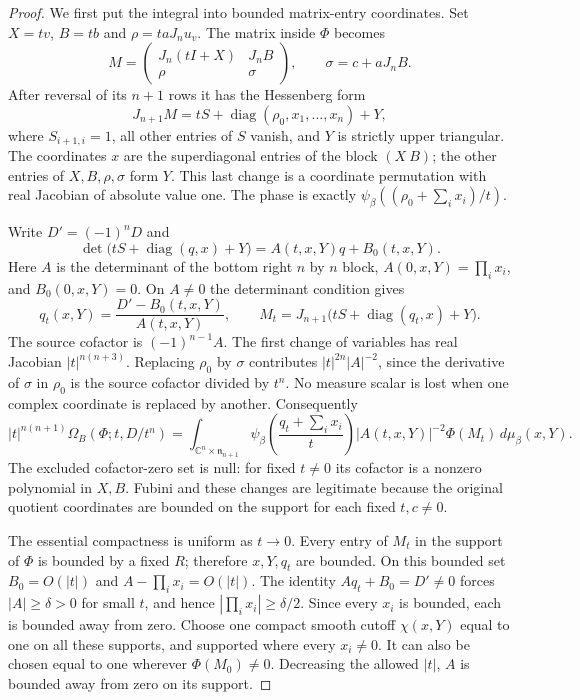 \begin{proof}
We first put the integral into bounded matrix-entry coordinates.
Set $X=tv$, $B=tb$ and $\rho=t aJ_nu_v$.  The matrix inside
$\Phi$ becomes
\[
 M=\begin{pmatrix}J_n(tI+X)&J_nB\\ \rho&\sigma\end{pmatrix},
 \qquad \sigma=c+aJ_nB.
\]
After reversal of its $n+1$ rows it has the Hessenberg form
\begin{equation}\label{terminal-density-hessenberg}
 J_{n+1}M=tS+\operatorname{diag}(\rho_0,x_1,\ldots,x_n)+Y,
\end{equation}
where $S_{i+1,i}=1$, all other entries of $S$ vanish, and $Y$
is strictly upper triangular.  The coordinates $x$ are the
superdiagonal entries of the block $(X\ B)$; the other entries
of $X,B,\rho,\sigma$ form $Y$.  This last change is a coordinate
permutation with real Jacobian of absolute value one.  The phase
is exactly $\psi_\beta((\rho_0+\sum_i x_i)/t)$.

Write $D'=(-1)^nD$ and
\[
 \det\bigl(tS+\operatorname{diag}(q,x)+Y\bigr)
                       =A(t,x,Y)q+B_0(t,x,Y).
\]
Here $A$ is the determinant of the bottom right $n$ by $n$ block,
$A(0,x,Y)=\prod_i x_i$, and $B_0(0,x,Y)=0$.
On $A\ne0$ the determinant condition gives
\[
 q_t(x,Y)=\frac{D'-B_0(t,x,Y)}{A(t,x,Y)},\qquad
 M_t=J_{n+1}\bigl(tS+\operatorname{diag}(q_t,x)+Y\bigr).
\]
The source cofactor is $(-1)^{n-1}A$.  The first change of
variables has real Jacobian $|t|^{n(n+3)}$.  Replacing
$\rho_0$ by $\sigma$ contributes $|t|^{2n}|A|^{-2}$,
since the derivative of $\sigma$ in $\rho_0$ is the source
cofactor divided by $t^n$.  No measure scalar is lost when one
complex coordinate is replaced by another.  Consequently
\begin{equation}\label{terminal-density-reduction}
 |t|^{n(n+1)}\Omega_B(\Phi;t,D/t^n)
   =\int_{\mathbb C^n\times\mathfrak n_{n+1}}
      \psi_\beta\left(\frac{q_t+\sum_i x_i}{t}\right)
          |A(t,x,Y)|^{-2}\Phi(M_t)\,d\mu_\beta(x,Y).
\end{equation}
The excluded cofactor-zero set is null: for fixed $t\ne0$ its
cofactor is a nonzero polynomial in $X,B$.  Fubini and these
changes are legitimate because the original quotient coordinates
are bounded on the support for each fixed $t,c\ne0$.

The essential compactness is uniform as $t\to0$.  Every entry
of $M_t$ in the support of $\Phi$ is bounded by a fixed $R$;
therefore $x,Y,q_t$ are bounded.  On this bounded set
$B_0=O(|t|)$ and $A-\prod_i x_i=O(|t|)$.  The identity
$Aq_t+B_0=D'\ne0$ forces $|A|\ge\delta>0$ for small $t$,
and hence $|\prod_i x_i|\ge\delta/2$.  Since every $x_i$ is
bounded, each is bounded away from zero.  Choose one compact
smooth cutoff $\chi(x,Y)$ equal to one on all these supports,
and supported where every $x_i\ne0$.  It can also be chosen
equal to one wherever $\Phi(M_0)\ne0$.  Decreasing the allowed
$|t|$, $A$ is bounded away from zero on its support.


\end{proof}
